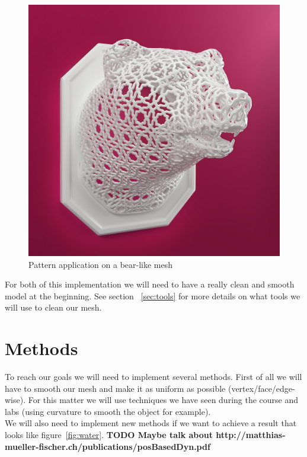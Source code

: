 \documentclass[10pt,conference,compsocconf]{IEEEtran}
\begin{document}
\begin{figure}[tbp]
	\centering
	\includegraphics[width=\columnwidth]{3d-printed-lamps-animal-lace-bear}
	\caption{Pattern application on a bear-like mesh}
	\vspace{-3mm}
	\label{fig:bear}
\end{figure}

For both of this implementation we will need to have a really clean and smooth model at the beginning. See section ~\ref{sec:tools} for more details on what tools we will use to clean our mesh.


\section{Methods}
\label{sec:methods}
To reach our goals we will need to implement several methods. First of all we will have to smooth our mesh and make it as uniform as possible (vertex/face/edge-wise). For this matter we will use techniques we have seen during the course and labs (using curvature to smooth the object for example).\\
We will also need to implement new methods if we want to achieve a result that looks like figure~\ref{fig:water}. 
\textbf{TODO Maybe talk about http://matthias-mueller-fischer.ch/publications/posBasedDyn.pdf}
\end{document}
